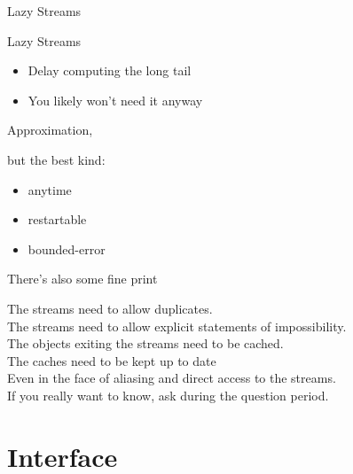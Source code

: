 \documentclass{beamer}
\begin{document}
\begin{frame}
\begin{center}
\Huge Lazy Streams
\end{center}
\end{frame}

\begin{frame}
\begin{center}
\Huge Lazy Streams
\end{center}
\begin{itemize}
\item Delay computing the long tail
\item You likely won't need it anyway
\end{itemize}
\end{frame}

\begin{frame}
\begin{center}
\Huge Approximation,
\end{center}
\pause
but the best kind:
\begin{itemize}
\item anytime
\item restartable
\item bounded-error
\end{itemize}
\end{frame}

\begin{frame}
\begin{center}
\Huge There's also some fine print
\end{center}
\tiny
The streams need to allow duplicates. \\
The streams need to allow explicit statements of impossibility. \\
The objects exiting the streams need to be cached. \\
The caches need to be kept up to date \\
Even in the face of aliasing and direct access to the streams. \\
If you really want to know, ask during the question period.

\end{frame}

\section{Interface}
\end{document}
